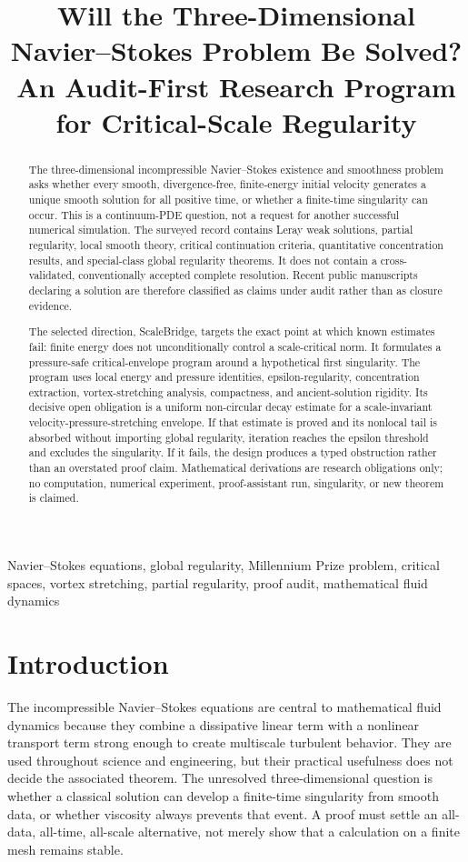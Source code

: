 \documentclass[conference]{../../../../Conference-LaTeX-template_10-17-19/IEEEtran}
\title{Will the Three-Dimensional Navier--Stokes Problem Be Solved?\\
An Audit-First Research Program for Critical-Scale Regularity}
\author{\IEEEauthorblockN{Research Proposal}
\IEEEauthorblockA{Evidence-bounded four-agent synthesis -- Mathematical design only}}
\begin{document}
\maketitle

\begin{abstract}
The three-dimensional incompressible Navier--Stokes existence and smoothness problem asks whether every smooth, divergence-free, finite-energy initial velocity generates a unique smooth solution for all positive time, or whether a finite-time singularity can occur. This is a continuum-PDE question, not a request for another successful numerical simulation. The surveyed record contains Leray weak solutions, partial regularity, local smooth theory, critical continuation criteria, quantitative concentration results, and special-class global regularity theorems. It does not contain a cross-validated, conventionally accepted complete resolution. Recent public manuscripts declaring a solution are therefore classified as claims under audit rather than as closure evidence.

The selected direction, ScaleBridge, targets the exact point at which known estimates fail: finite energy does not unconditionally control a scale-critical norm. It formulates a pressure-safe critical-envelope program around a hypothetical first singularity. The program uses local energy and pressure identities, epsilon-regularity, concentration extraction, vortex-stretching analysis, compactness, and ancient-solution rigidity. Its decisive open obligation is a uniform non-circular decay estimate for a scale-invariant velocity-pressure-stretching envelope. If that estimate is proved and its nonlocal tail is absorbed without importing global regularity, iteration reaches the epsilon threshold and excludes the singularity. If it fails, the design produces a typed obstruction rather than an overstated proof claim. Mathematical derivations are research obligations only; no computation, numerical experiment, proof-assistant run, singularity, or new theorem is claimed.
\end{abstract}
\begin{IEEEkeywords}
Navier--Stokes equations, global regularity, Millennium Prize problem, critical spaces, vortex stretching, partial regularity, proof audit, mathematical fluid dynamics
\end{IEEEkeywords}

\section{Introduction}
The incompressible Navier--Stokes equations are central to mathematical fluid dynamics because they combine a dissipative linear term with a nonlinear transport term strong enough to create multiscale turbulent behavior. They are used throughout science and engineering, but their practical usefulness does not decide the associated theorem. The unresolved three-dimensional question is whether a classical solution can develop a finite-time singularity from smooth data, or whether viscosity always prevents that event. A proof must settle an all-data, all-time, all-scale alternative, not merely show that a calculation on a finite mesh remains stable.
\end{document}
